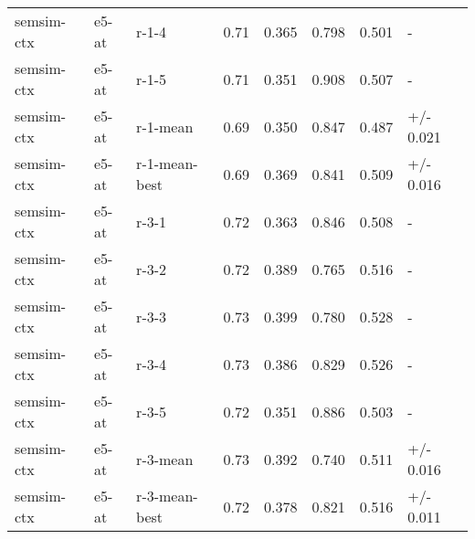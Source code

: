 \begin{tabular}{llllll}
semsim-ctx & e5-at & r-1-4 & 0.71 & 0.365 & 0.798 & 0.501 & - \\
semsim-ctx & e5-at & r-1-5 & 0.71 & 0.351 & 0.908 & 0.507 & - \\
semsim-ctx & e5-at & r-1-mean & 0.69 & 0.350 & 0.847 & 0.487 & +/- 0.021 \\
semsim-ctx & e5-at & r-1-mean-best & 0.69 & 0.369 & 0.841 & 0.509 & +/- 0.016 \\
semsim-ctx & e5-at & r-3-1 & 0.72 & 0.363 & 0.846 & 0.508 & - \\
semsim-ctx & e5-at & r-3-2 & 0.72 & 0.389 & 0.765 & 0.516 & - \\
semsim-ctx & e5-at & r-3-3 & 0.73 & 0.399 & 0.780 & 0.528 & - \\
semsim-ctx & e5-at & r-3-4 & 0.73 & 0.386 & 0.829 & 0.526 & - \\
semsim-ctx & e5-at & r-3-5 & 0.72 & 0.351 & 0.886 & 0.503 & - \\
semsim-ctx & e5-at & r-3-mean & 0.73 & 0.392 & 0.740 & 0.511 & +/- 0.016 \\
semsim-ctx & e5-at & r-3-mean-best & 0.72 & 0.378 & 0.821 & 0.516 & +/- 0.011 \\
\bottomrule
\end{tabular}
